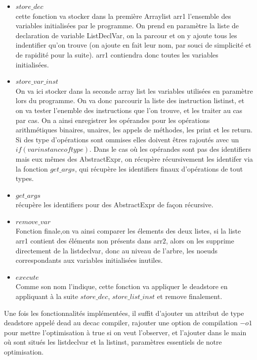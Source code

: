 \documentclass[a4paper]{article}
\begin{document}
\begin{itemize}
\item \texttt{$store\_dec$} \\
cette fonction va stocker dans la première Arraylist arr1 l'ensemble des variables initialisées par le programme. On prend en paramètre la liste de declaration de variable ListDeclVar, on la parcour et on y ajoute tous les indentifier qu'on trouve (on ajoute en fait leur nom, par souci de simplicité et de rapidité pour la suite).
arr1 contiendra donc toutes les variables initialisées.
\item \texttt{$store\_var\_inst$} \\
On va ici stocker dans la seconde array list les variables utilisées en paramètre lors du programme. On va donc parcourir la liste des instruction listinst, et on va tester l'enemble des instructions que l'on trouve, et les traiter au cas par cas.
On a ainsi enregistrer les opérandes pour les opérations arithmétiques binaires, unaires, les appels de méthodes, les print et les return. Si des type d'opérations sont ommises elles doivent êtres rajoutés avec un $if(var instanceof type)$.
Dans le cas où les opérandes sont pas des identifiers mais eux mêmes des AbstractExpr, on récupère récursivement les identifer via la fonction $get\_args$, qui récupère les identifiers finaux d'opérations de tout types.
\item \texttt{$get\_args$}\\
récupère les identifiers pour des AbstractExpr de façon récursive.
\item \texttt{$remove\_var$}\\
Fonction finale,on va ainsi comparer les élements des deux listes, si la liste arr1 contient des éléments non présents dans arr$2$, alors on les supprime directement de la listdeclvar, donc au niveau de l'arbre, les noeuds correspondants aux variables initialisées inutiles.
\item \texttt{$execute$}\\
Comme son nom l'indique, cette fonction va appliquer le deadstore en appliquant à la suite $store\_dec$, $store\_list\_inst$ et remove finalement.
\end{itemize}
Une fois les fonctionnalités implémentées, il suffit d'ajouter un attribut de type deadstore appelé dead au decac compiler, rajouter une option de compilation $-o1$ pour mettre l'optimisation à true si on veut l'observer, et l'ajouter dans le main où sont situés les listdeclvar et la listinst, paramètres essentiels de notre optimisation.
\end{document}
